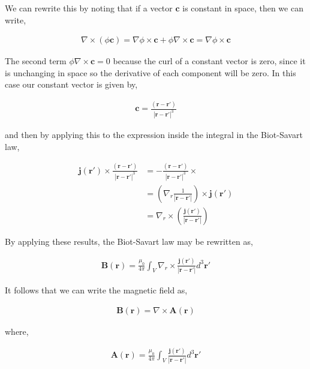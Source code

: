 \documentclass[11pt]{amsart}
\begin{document}
We can rewrite this by noting that if a vector $\mathbf{c}$ is constant in space, then we can write,

\begin{align*}
  \nabla\times(\phi\mathbf{c}) = \nabla\phi\times\mathbf{c}+\phi\nabla\times\mathbf{c} = \nabla\phi\times\mathbf{c}
\end{align*}

The second term $\phi\nabla\times\mathbf{c} = 0$ because the curl of a constant vector is zero, since it is unchanging in space so the derivative of each component will be zero. In this case our constant vector is given by,

\begin{align*}
  \mathbf{c} = \frac{(\mathbf{r}-\mathbf{r'})}{{|\mathbf{r}-\mathbf{r'}|}^3}
\end{align*}

and then by applying this to the expression inside the integral in the Biot-Savart law,

\begin{align*}
  \mathbf{j}(\mathbf{r'})\times\frac{(\mathbf{r}-\mathbf{r'})}{{|\mathbf{r}-\mathbf{r'}|}^3} &= -\frac{(\mathbf{r}-\mathbf{r'})}{{|\mathbf{r}-\mathbf{r'}|}^3}\times \\
  &= \left(\nabla_r \frac{1}{|\mathbf{r}-\mathbf{r'}|}\right)\times\mathbf{j}(\mathbf{r'}) \\
  &= \nabla_r\times\left(\frac{\mathbf{j}(\mathbf{r'})}{|\mathbf{r}-\mathbf{r'}|}\right)
\end{align*}

By applying these results, the Biot-Savart law may be rewritten as,

\begin{align*}
  \mathbf{B}(\mathbf{r}) = \frac{\mu_0}{4\pi}\int_V\nabla_r\times\frac{\mathbf{j}(\mathbf{r'})}{|\mathbf{r}-\mathbf{r'}|} d^3\mathbf{r'}
\end{align*}

It follows that we can write the magnetic field as,

\begin{align*}
  \mathbf{B}(\mathbf{r}) = \nabla\times\mathbf{A}(\mathbf{r})
\end{align*}

where,

\begin{align*}
  \mathbf{A}(\mathbf{r}) = \frac{\mu_0}{4\pi}\int_V\frac{\mathbf{j}(\mathbf{r'})}{|\mathbf{r}-\mathbf{r'}|}d^3\mathbf{r'}
\end{align*}
\end{document}

